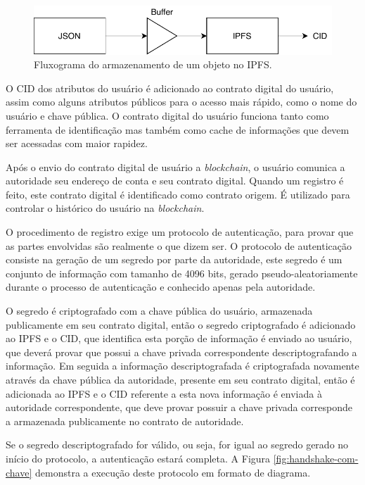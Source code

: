 \documentclass[tcc,capa]{texufpel}
\begin{document}
        \begin{figure}[h!]
            \centering
            \includegraphics[width=15cm]{fluxograma-armazenamento-ipfs.pdf}
            \caption{Fluxograma do armazenamento de um objeto no IPFS.}
            \label{fig:fluxograma-ipfs}
        \end{figure}
        
        O CID dos atributos do usuário é adicionado ao contrato digital do usuário, assim como alguns atributos públicos para o acesso mais rápido, como o nome do usuário e chave pública. O contrato digital do usuário funciona tanto como ferramenta de identificação mas também como cache de informações que devem ser acessadas com maior rapidez.
        
        Após o envio do contrato digital de usuário a \textit{blockchain}, o usuário comunica a autoridade seu endereço de conta e seu contrato digital. Quando um registro é feito, este contrato digital é identificado como contrato origem. É utilizado para controlar o histórico do usuário na \textit{blockchain}. 
        
        O procedimento de registro exige um protocolo de autenticação, para provar que as partes envolvidas são realmente o que dizem ser. O protocolo de autenticação consiste na geração de um segredo por parte da autoridade, este segredo é um conjunto de informação com tamanho de 4096 bits, gerado pseudo-aleatoriamente durante o processo de autenticação e conhecido apenas pela autoridade.
        
        O segredo é criptografado com a chave pública do usuário, armazenada publicamente em seu contrato digital, então o segredo criptografado é adicionado ao IPFS e o CID, que identifica esta porção de informação é enviado ao usuário, que deverá provar que possui a chave privada correspondente descriptografando a informação. Em seguida a informação descriptografada é criptografada novamente através da chave pública da autoridade, presente em seu contrato digital, então é adicionada ao IPFS e o CID referente a esta nova informação é enviada à autoridade correspondente, que deve provar possuir a chave privada corresponde a armazenada publicamente no contrato de autoridade.
        
        Se o segredo descriptografado for válido, ou seja, for igual ao segredo gerado no início do protocolo, a autenticação estará completa. A Figura \ref{fig:handshake-com-chave} demonstra a execução deste protocolo em formato de diagrama.
\end{document}
